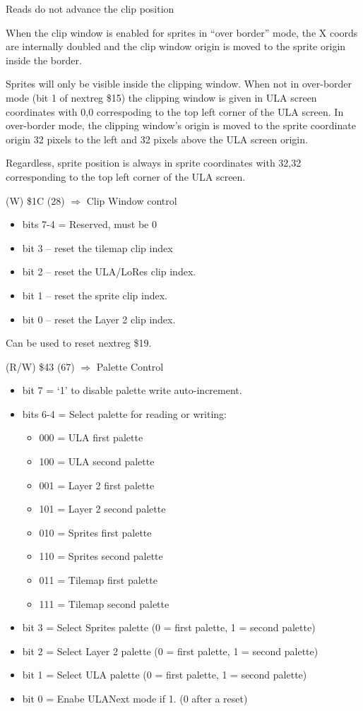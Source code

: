 Reads do not advance the clip position

When the clip window is enabled for sprites in “over border” mode, the
X coords are internally doubled and the clip window origin is moved to
the sprite origin inside the border.

Sprites will only be visible inside the clipping window. When not in
over-border mode (bit 1 of nextreg \$15) the clipping window is given
in ULA screen coordinates with 0,0 correspoding to the top left corner
of the ULA screen. In over-border mode, the clipping window’s origin
is moved to the sprite coordinate origin 32 pixels to the left and 32
pixels above the ULA screen origin.

Regardless, sprite position is always in sprite coordinates with 32,32
corresponding to the top left corner of the ULA screen.

(W) \$1C (28) $\Rightarrow$ Clip Window control
\begin{itemize}
\item[] bits 7-4 = Reserved, must be 0
\item[] bit 3 – reset the tilemap clip index
\item[] bit 2 – reset the ULA/LoRes clip index.
\item[] bit 1 – reset the sprite clip index.
\item[] bit 0 – reset the Layer 2 clip index.
\end{itemize}

Can be used to reset nextreg \$19.

(R/W) \$43 (67) $\Rightarrow$ Palette Control
\begin{itemize}
\item[] bit 7 = ‘1’ to disable palette write auto-increment.
\item[] bits 6-4 = Select palette for reading or writing:
  \begin{itemize}
  \item[] 000 = ULA first palette
  \item[] 100 = ULA second palette
  \item[] 001 = Layer 2 first palette
  \item[] 101 = Layer 2 second palette
  \item[] 010 = Sprites first palette
  \item[] 110 = Sprites second palette
  \item[] 011 = Tilemap first palette
  \item[] 111 = Tilemap second palette
  \end{itemize}
\item[] bit 3 = Select Sprites palette (0 = first palette, 1 = second
  palette)
\item[] bit 2 = Select Layer 2 palette (0 = first palette, 1 = second
  palette)
\item[] bit 1 = Select ULA palette (0 = first palette, 1 = second
  palette)
\item[] bit 0 = Enabe ULANext mode if 1. (0 after a reset)
\end{itemize}

